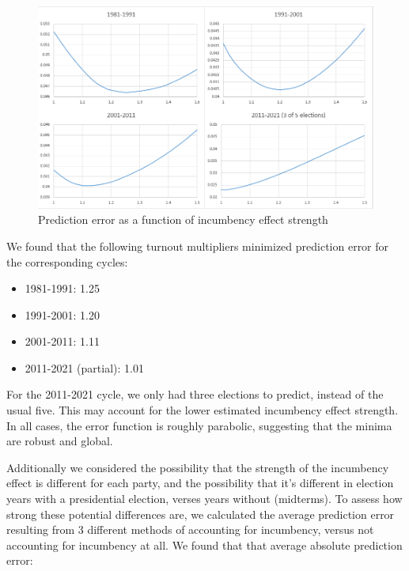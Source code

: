 \documentclass[preprint,12pt]{article}
\begin{document}
\begin{figure}[htb!]
    \begin{center}
        \includegraphics[scale=0.5]{Figures/incumbency.png}
        \caption{Prediction error as a function of incumbency effect strength}\label{fig:incumbency}
    \end{center}
\end{figure}

We found that the following turnout multipliers minimized prediction error for the corresponding cycles:

\begin{itemize}
\item 1981-1991: 1.25
\item 1991-2001: 1.20
\item 2001-2011: 1.11
\item 2011-2021 (partial): 1.01
\end{itemize}

For the 2011-2021 cycle, we only had three elections to predict, instead of the usual five.  This may account for the lower estimated incumbency effect strength.  In all cases, the error function is roughly parabolic, suggesting that the minima are robust and global.

Additionally we considered the possibility that the strength of the incumbency effect is different for each party, and the possibility that it's different in election years with a presidential election, verses years without (midterms).  To assess how strong these potential differences are, we calculated the average prediction error resulting from 3 different methods of accounting for incumbency, versus not accounting for incumbency at all.  We found that that average absolute prediction error:
\end{document}
